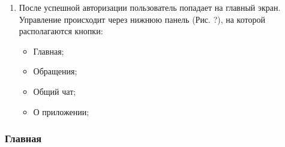 \documentclass{../includes/TechDoc}
\begin{document}
\begin{enumerate}
        \item После успешной авторизации пользователь попадает на главный экран.
        Управление происходит через нижнюю панель (Рис. ?), на которой располагаются кнопки:
        \begin{itemize}[noitemsep]
            \item Главная;
            \item Обращения;
            \item Общий чат;
            \item О приложении;
        \end{itemize}
    \end{enumerate}

    \subsubsection{Главная}
\end{document}
